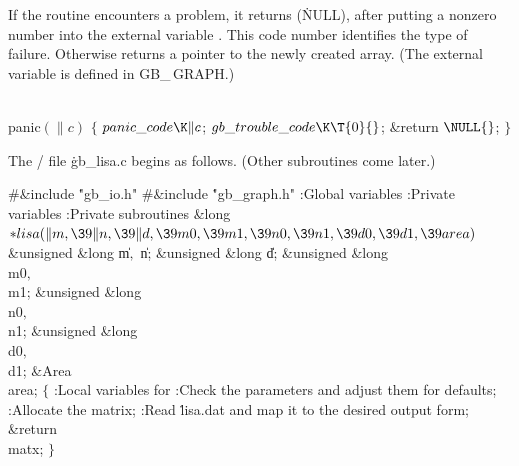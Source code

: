 If the  routine encounters a problem, it returns \PB{$\NULL$}
(\.{NULL}), after putting a nonzero number into the external variable
. This code number identifies the type of failure.
Otherwise  returns a pointer to the newly created array. (The
external variable  is defined in {\sc GB\_\,GRAPH}.)

\Y\B\4\D\\{panic}$(\|c)$\5
${}\{{}$\5
\1${}\\{panic\_code}\K\|c{}$;\5
${}\\{gb\_trouble\_code}\K\T{0}{}$;\5
\&{return} ${}\NULL{}$;\5
${}\}{}$\2\par
\fi

The \CEE/ file \.{gb\_lisa.c} begins as follows. (Other subroutines
come later.)

\Y\B\8\#\&{include} \.{"gb\_io.h"}\6
\8\#\&{include} \.{"gb\_graph.h"}\6
\ATH\7
:Global variables\X\6
:Private variables\X\6
:Private subroutines\X\7
\1\1\&{long} ${}{*}\\{lisa}(\|m,\39\|n,\39\|d,\39\\{m0},\39\\{m1},\39\\{n0},\39%
\\{n1},\39\\{d0},\39\\{d1},\39\\{area}){}$\6
\&{unsigned} \&{long} \|m${},{}$ \|n;\6
\&{unsigned} \&{long} \|d;\6
\&{unsigned} \&{long} \\{m0}${},{}$ \\{m1};\C{ input will be from rows $[\PB{%
\\{m0}}\,.\,.\,\PB{\\{m1}})$ }\6
\&{unsigned} \&{long} \\{n0}${},{}$ \\{n1};\C{ and from columns $[\PB{\\{n0}}%
\,.\,.\,\PB{\\{n1}})$ }\6
\&{unsigned} \&{long} \\{d0}${},{}$ \\{d1};\6
\&{Area} \\{area};\2\2\6
${}\{{}$\5
\1:Local variables for \X\7
:Check the parameters and adjust them for defaults\X;\6
:Allocate the matrix\X;\6
:Read \.{lisa.dat} and map it to the desired output form\X;\6
\&{return} \\{matx};\6
\4${}\}{}$\2\par
\fi

